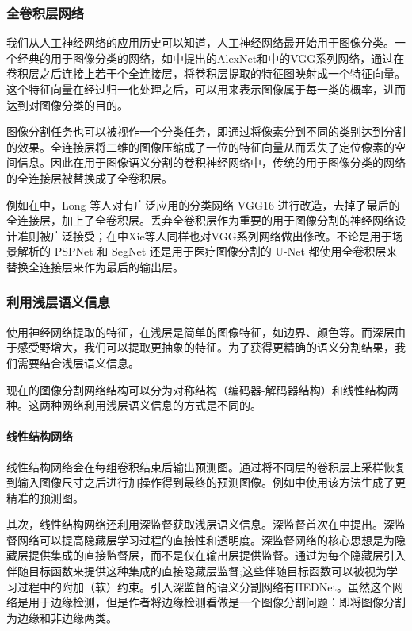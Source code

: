 \subsubsection{全卷积层网络}
我们从人工神经网络的应用历史可以知道，人工神经网络最开始用于图像分类。一个经典的用于图像分类的网络，如\cite{krizhevsky2012imagenet}中提出的AlexNet和\cite{simonyan2014very}中的VGG系列网络，通过在卷积层之后连接上若干个全连接层，将卷积层提取的特征图映射成一个特征向量。这个特征向量在经过归一化处理之后，可以用来表示图像属于每一类的概率，进而达到对图像分类的目的。

图像分割任务也可以被视作一个分类任务，即通过将像素分到不同的类别达到分割的效果。全连接层将二维的图像压缩成了一位的特征向量从而丢失了定位像素的空间信息。因此在用于图像语义分割的卷积神经网络中，传统的用于图像分类的网络的全连接层被替换成了全卷积层。

例如在\cite{long2015fully}中，Long 等人对有广泛应用的分类网络 VGG16\cite{simonyan2014very} 进行改造，去掉了最后的全连接层，加上了全卷积层。丢弃全卷积层作为重要的用于图像分割的神经网络设计准则被广泛接受；在\cite{xie2015holistically}中Xie等人同样也对VGG系列网络做出修改。不论是用于场景解析的 PSPNet\cite{zhao2017pyramid} 和 SegNet\cite{badrinarayanan2017segnet} 还是用于医疗图像分割的 U-Net\cite{ronneberger2015u} 都使用全卷积层来替换全连接层来作为最后的输出层。


\subsubsection{利用浅层语义信息}
使用神经网络提取的特征，在浅层是简单的图像特征，如边界、颜色等。而深层由于感受野增大，我们可以提取更抽象的特征。为了获得更精确的语义分割结果，我们需要结合浅层语义信息。

现在的图像分割网络结构可以分为对称结构（编码器-解码器结构）和线性结构两种。这两种网络利用浅层语义信息的方式是不同的。
\paragraph{线性结构网络}
线性结构网络会在每组卷积结束后输出预测图。通过将不同层的卷积层上采样恢复到输入图像尺寸之后进行加操作得到最终的预测图像。例如\cite{long2015fully}中使用该方法生成了更精准的预测图。

其次，线性结构网络还利用深监督获取浅层语义信息。深监督首次在\cite{lee2015deeply}中提出。深监督网络可以提高隐藏层学习过程的直接性和透明度。深监督网络的核心思想是为隐藏层提供集成的直接监督层，而不是仅在输出层提供监督。通过为每个隐藏层引入伴随目标函数来提供这种集成的直接隐藏层监督;这些伴随目标函数可以被视为学习过程中的附加（软）约束。引入深监督的语义分割网络有HEDNet\cite{xie2015holistically}。虽然这个网络是用于边缘检测，但是作者将边缘检测看做是一个图像分割问题：即将图像分割为边缘和非边缘两类。

